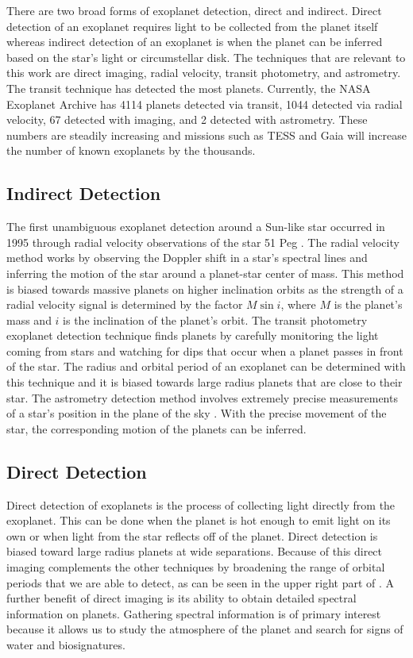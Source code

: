 There are two broad forms of exoplanet detection, direct and indirect. Direct
detection of an exoplanet requires light to be collected from the planet itself
whereas indirect detection of an exoplanet is when the planet can be inferred
based on the star's light or circumstellar disk. The techniques that are
relevant to this work are direct imaging, radial velocity, transit photometry,
and astrometry. The transit technique has detected the most planets. Currently,
the NASA Exoplanet Archive has 4114 planets detected via transit, 1044 detected
via radial velocity, 67 detected with imaging, and 2 detected with astrometry.
These numbers are steadily increasing and missions such as TESS
\citep{Huang2018} and Gaia \citep{Perryman2018a} will increase the number of
known exoplanets by the thousands.

\subsection{Indirect Detection} 

The first unambiguous exoplanet detection around a Sun-like star occurred in
1995 through radial velocity observations of the star 51 Peg
\citep{mayorJupitermassCompanion1995}. The radial velocity method works by
observing the Doppler shift in a star's spectral lines and inferring the motion
of the star around a planet-star center of mass. This method is biased towards
massive planets on higher inclination orbits as the strength of a radial
velocity signal is determined by the factor $M\sin{i}$, where $M$ is the
planet's mass and $i$ is the inclination of the planet's orbit. The transit
photometry exoplanet detection technique finds planets by carefully monitoring
the light coming from stars and watching for dips that occur when a planet
passes in front of the star. The radius and orbital period of an exoplanet can
be determined with this technique and it is biased towards large radius planets
that are close to their star. The astrometry detection method involves
extremely precise measurements of a star's position in the plane of the sky
\citep{Perryman2018a}. With the precise movement of the star, the corresponding
motion of the planets can be inferred.


\subsection{Direct Detection}

Direct detection of exoplanets is the process of collecting light directly from
the exoplanet. This can be done when the planet is hot enough to emit light on
its own or when light from the star reflects off of the planet. Direct
detection is biased toward large radius planets at wide separations. Because of
this direct imaging complements the other techniques by broadening the range of
orbital periods that we are able to detect, as can be seen in the upper right
part of . A further benefit of direct
imaging is its ability to obtain detailed spectral information on planets.
Gathering spectral information is of primary interest because it allows us to
study the atmosphere of the planet and search for signs of water and
biosignatures.

